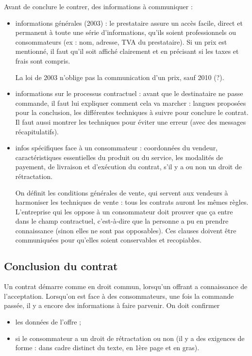 		Avant de conclure le contrer, des informations à communiquer :
		
		\begin{itemize}
			\item informations générales (2003) : le prestataire assure un accès facile, direct et permanent à toute une série d'informations, qu'ils soient professionnels ou consommateurs (ex : nom, adresse, TVA du prestataire). Si un prix est mentionné, il faut qu'il soit affiché clairement et en précisant si les taxes et frais sont compris.
			
			La loi de 2003 n'oblige pas la communication d'un prix, sauf 2010 (?).
			
			\item informations sur le processus contractuel : avant que le destinataire ne passe commande, il faut lui expliquer comment cela va marcher : langues proposées pour la conclusion, les différentes techniques à suivre pour conclure le contrat. Il faut aussi montrer les techniques pour éviter une erreur (avec des messages récapitulatifs).			
			
			\item infos spécifiques face à un consommateur : coordonnées du vendeur, caractéristiques essentielles du produit ou du service, les modalités de payement, de livraison et d'exécution du contrat, s'il y a ou non un droit de rétractation.
			
			On définit les conditions générales de vente, qui servent aux vendeurs à harmoniser les techniques de vente : tous les contrats auront les mêmes règles. L'entreprise qui les oppose à un consommateur doit prouver que ça entre dans le champ contractuel, c'est-à-dire que la personne a pu en prendre connaissance (sinon elles ne sont pas opposables). Ces clauses doivent être communiquées pour qu'elles soient conservables et recopiables.
		\end{itemize}
	
		\subsection{Conclusion du contrat}
		
		Un contrat démarre comme en droit commun, lorsqu'un offrant a connaissance de l'acceptation. Lorsqu'on est face à des consommateurs, une fois la commande passée, il y a encore des informations à faire parvenir. On doit confirmer
		
		\begin{itemize}
			\item les données de l'offre ;
			\item si le consommateur a un droit de rétractation ou non (il y a des exigences de forme : dans cadre distinct du texte, en 1ère page et en gras).
		\end{itemize}
		
